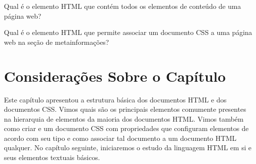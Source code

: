 \begin{exercise}
Qual é o elemento HTML que contém todos os elementos de conteúdo de uma página web?
\end{exercise}

\begin{exercise}
Qual é o elemento HTML que permite associar um documento CSS a uma página web na seção de metainformações?
\end{exercise}

\section{Considerações Sobre o Capítulo}

Este capítulo apresentou a estrutura básica dos documentos HTML e dos documentos CSS. Vimos quais são os principais elementos comumente presentes na hierarquia de elementos da maioria dos documentos HTML. Vimos também como criar e um documento CSS com propriedades que configuram elementos de acordo com seu tipo e como associar tal documento a um documento HTML qualquer. No capítulo seguinte, iniciaremos o estudo da linguagem HTML em si e seus elementos textuais básicos.